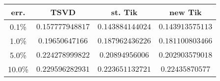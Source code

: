 \begin{tabular} { c | c | c | c }
err. & TSVD & st. Tik & new Tik \\ \hline 
0.1\% & $0.157777948817$ & $0.143884144024$ & $0.143913575113$ \\
1.0\% & $0.19650647166$ & $0.187962436226$ & $0.181100803466$ \\
5.0\% & $0.224278999822$ & $0.20894956006$ & $0.202903579018$ \\
10.0\% & $0.229596282931$ & $0.223651132721$ & $0.22435870577$ \\
\end{tabular}
